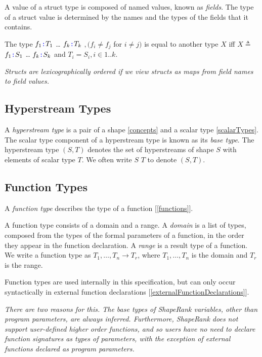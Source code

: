 \documentclass{article}
\begin{document}
A value of a struct type is composed of named values, known as {\em fields}. The type of a struct value is determined by the names and the types of the fields that it contains.

\StructType{}

\PropertySig{}

The type \LCURLY{}$f_1 \texttt{\color{blue} :}{} T_1$\COMMA{} \ldots\COMMA{}  $f_k \texttt{\color{blue} :}{} T_k$\RCURLY{} $, (f_i \ne f_j$ for $i \ne j)$ is equal to another type $X$ iff  $X \triangleq $ \LCURLY{}$f_1 \texttt{\color{blue} :}{} S_1$\COMMA{} \ldots\COMMA{}  $f_k \texttt{\color{blue} :}{} S_k$\RCURLY{} and $T_i = S_i, i \in 1..k$.


{\em
Structs are lexicographically ordered if we view structs as maps from field names to field values. 
}

\subsection{Hyperstream Types}
\label{hyperstreamTypes} 

A {\em hyperstream type} is a pair of a shape \ref{concepts} and a scalar type \ref{scalarTypes}. The scalar type component of a hyperstream type is known as its {\em base type}. The hyperstream type $(S,  T)$ denotes the set of hyperstreams of shape $S$ with elements of scalar type $T$. We often write $S$ $T$ to denote $(S,  T)$.

\subsection{Function Types}
\label{functionTypes}

A {\em function type} describes the type of a function [\ref{functions}].

A function type consists of a domain and a range. A {\em domain} is a list of types, composed from the types of the formal parameters of a function, in the order they appear in the function declaration. A {\em range} is a result type of a function. 
We write a  function type as $T_1, \ldots, T_n \to T_r$, where $T_1, \ldots, T_n$ is the domain and $T_r$ is the range.

Function types are used internally in this specification, but can only occur syntactically in external function declarations [\ref{externalFunctionDeclarations}].

{\em 
There are two reasons for this.  The base types of ShapeRank variables, other than program parameters, are always inferred. Furthermore, ShapeRank does not support user-defined higher order functions, and so users have no need to declare function signatures as types of parameters,
with the exception of external functions declared as program parameters.
}
\end{document}
